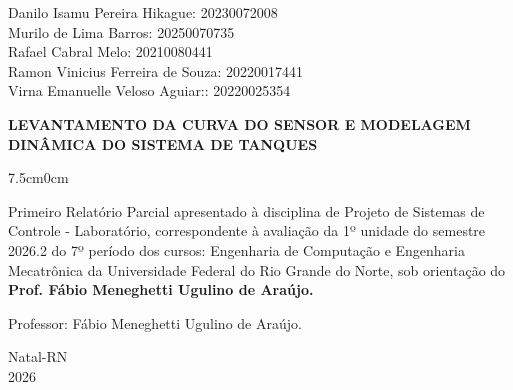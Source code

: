 \documentclass[a4paper,12pt]{article}
\begin{document}
\newpage


\thispagestyle{empty}

\begin{center}
\begin{normalsize}
Danilo Isamu Pereira Hikague: 20230072008\\
\vspace{0.8cm}
Murilo de Lima Barros: 20250070735\\
\vspace{0.8cm}
Rafael Cabral Melo: 20210080441\\
\vspace{0.8cm}
Ramon Vinicius Ferreira de Souza: 20220017441\\
\vspace{0.8cm}
Virna Emanuelle Veloso Aguiar:: 20220025354\\

\end{normalsize}
\end{center}
\vspace{3cm}

{\bf{\large {\centering LEVANTAMENTO DA CURVA DO SENSOR E MODELAGEM DINÂMICA DO SISTEMA DE TANQUES\\
}}}

\vspace{4cm}

\begin{adjustwidth}{7.5cm}{0cm}

{\normalsize

Primeiro Relatório Parcial apresentado à disciplina de
Projeto de Sistemas de Controle - Laboratório, correspondente à
avaliação da 1º unidade do semestre 2026.2 do 7º período
dos cursos: Engenharia de Computação e Engenharia Mecatrônica da
Universidade Federal do Rio Grande do Norte, sob
orientação do {\bf Prof. Fábio Meneghetti Ugulino de
Araújo.}

}

\end{adjustwidth}

\vspace{2cm}

\begin{center}

Professor:  Fábio Meneghetti Ugulino de Araújo.

\vspace{2.5cm}

{\large Natal-RN\\
2026}

\end{center}
\end{document}
